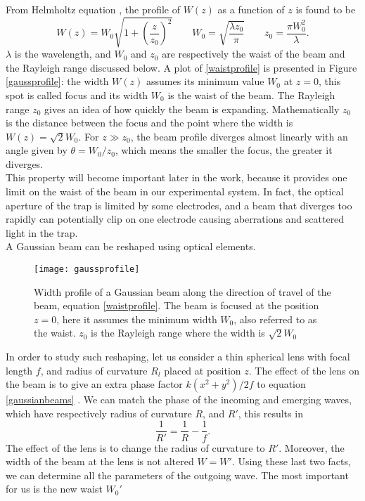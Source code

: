 From Helmholtz equation \cite{saleh}, the profile of $W(z)$ as a function of $z$ is found to be
\begin{equation}
\label{waistprofile}
W(z) = W_0 \sqrt{1 + \left(\frac{z}{z_0}\right)^2}\qquad W_0 = \sqrt{\frac{\lambda z_0}{\pi}} \qquad z_0 = \frac{\pi W_0^2}{\lambda}.
\end{equation}
$\lambda$ is the wavelength, and $W_0$ and $z_0$ are respectively the waist of the beam and the Rayleigh range discussed below. A plot of \eqref{waistprofile} is presented in Figure \eqref{gaussprofile}:
the width $W(z)$ assumes its minimum value $W_0$ at $z=0$, this spot is called focus and its width $W_0$ is the waist of the beam. The Rayleigh range $z_0$ gives an idea of how quickly the beam is expanding. Mathematically $z_0$ is the distance between the focus and the point where the width is $W(z) = \sqrt{2}W_0$.
For $z \gg z_0$, the beam profile diverges almost linearly with an angle given by $\theta = W_0/z_0$, which means the smaller the focus, the greater it diverges.\\
This property will become important later in the work, because it provides one limit on the waist of the beam in our experimental system. In fact, the optical aperture of the trap is limited by some electrodes, and a beam that diverges too rapidly can potentially clip on one electrode causing aberrations and scattered light in the trap.\\
A Gaussian beam can be reshaped using optical elements.
\begin{figure}
\centering
\texttt{[image: gaussprofile]}
\caption{Width profile of a Gaussian beam along the direction of travel of the beam, equation \eqref{waistprofile}. The beam is focused at the position $z = 0$, here it assumes the minimum width $W_0$, also referred to as the waist. $z_0$ is the Rayleigh range where the width is $\sqrt{2}W_0$}
\label{gaussprofile}
\end{figure}
In order to study such reshaping, let us consider a thin spherical lens with focal length $f$, and radius of curvature $R_l$ placed at position $z$. The effect of the lens on the beam is to give an extra phase factor $k(x^2 + y^2)/2f$ to equation \eqref{gaussianbeams} \cite{beamparameters}. We can match the phase of the incoming and emerging waves, which have respectively radius of curvature $R$, and $R'$, this results in
\begin{equation}
\frac{1}{R'} = \frac{1}{R} - \frac{1}{f}.
\end{equation}
The effect of the lens is to change the radius of curvature to $R'$. Moreover, the width of the beam at the lens is not altered $W=W'$. Using these last two facts, we can determine all the parameters of the outgoing wave. The most important for us is the new waist $W_0'$
